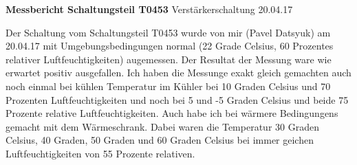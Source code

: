 \textbf{Messbericht Schaltungsteil T0453} Verstärkerschaltung 20.04.17

Der Schaltung vom Schaltungsteil T0453 wurde von mir (Pavel Datsyuk) am 20.04.17 mit Umgebungsbedingungen normal (22 Grade Celsius, 60 Prozentes relativer Luftfeuchtigkeiten) augemessen. Der Resultat der Messung ware wie erwartet positiv ausgefallen. Ich haben die Messunge exakt gleich gemachten auch noch einmal bei kühlen Temperatur im Kühler bei 10 Graden Celsius und 70 Prozenten Luftfeuchtigkeiten und noch bei 5 und -5 Graden Celsius und beide 75 Prozente relative Luftfeuchtigkeiten. Auch habe ich bei wärmere Bedingungens gemacht mit dem Wärmeschrank. Dabei waren die Temperatur 30 Graden Celsius, 40 Graden, 50 Graden und 60 Graden Celsius bei immer geichen Luftfeuchtigkeiten von 55 Prozente relativen.